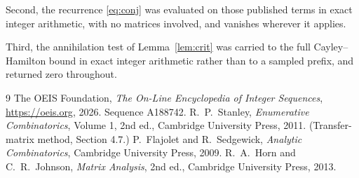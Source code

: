 \documentclass[11pt,a4paper]{article}
\theoremstyle{plain}
\theoremstyle{definition}
\begin{document}
Second, the recurrence \eqref{eq:conj} was evaluated on those published terms in exact
integer arithmetic, with no matrices involved, and vanishes wherever it applies.

Third, the annihilation test of Lemma~\ref{lem:crit} was carried to the full
Cayley--Hamilton bound in exact integer arithmetic rather than to a sampled prefix, and
returned zero throughout.

\begin{thebibliography}{9}
 The OEIS Foundation, \emph{The On-Line Encyclopedia of Integer
Sequences}, \url{https://oeis.org}, 2026. Sequence A188742.
 R.~P.~Stanley, \emph{Enumerative Combinatorics}, Volume 1, 2nd ed.,
Cambridge University Press, 2011. (Transfer-matrix method, Section 4.7.)
 P.~Flajolet and R.~Sedgewick, \emph{Analytic Combinatorics}, Cambridge
University Press, 2009.
 R.~A.~Horn and C.~R.~Johnson, \emph{Matrix Analysis}, 2nd ed., Cambridge
University Press, 2013.
\end{thebibliography}
\end{document}
